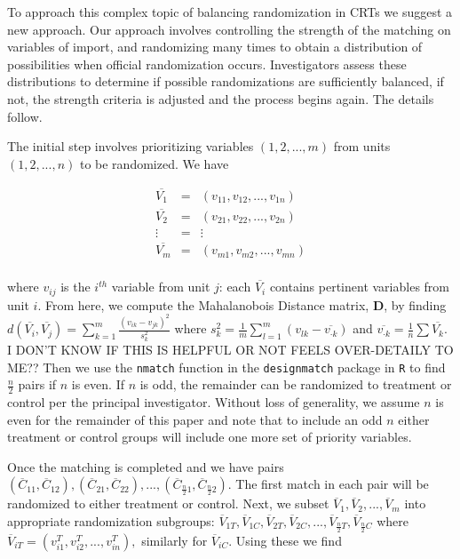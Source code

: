 \documentclass[]{sagej}
\begin{document}
To approach this complex topic of balancing randomization in CRTs we
suggest a new approach. Our approach involves controlling the strength
of the matching on variables of import, and randomizing many times to
obtain a distribution of possibilities when official randomization
occurs. Investigators assess these distributions to determine if
possible randomizations are sufficiently balanced, if not, the strength
criteria is adjusted and the process begins again. The details follow.

The initial step involves prioritizing variables \((1, 2,..., m)\) from
units \((1, 2, ..., n)\) to be randomized. We have

\begin{eqnarray*}
 \overline{V_1} & = & (v_{11}, v_{12},..., v_{1n})\\
 \overline{V_2} & = & (v_{21}, v_{22},..., v_{2n})\\
 \vdots & = & \vdots\\    
 \overline{V_m} & = & (v_{m1}, v_{m2},..., v_{mn})\\
 \end{eqnarray*}

where \(v_{ij}\) is the \(i^{th}\) variable from unit \(j\): each
\(\overline{V_i}\) contains pertinent variables from unit \(i\). From
here, we compute the Mahalanobois Distance matrix, \textbf{D}, by
finding
\(d(\overline{V_i}, \overline{V_j}) = \sum_{k=1}^m \frac{(v_{ik} - v_{jk})^2}{s_k^2}\)
where
\(s_k^2 = \frac{1}{m} \sum_{l=1}^m(v_{lk} - \overline{v_{\cdot k}})\)
and \(\overline{v_{\cdot k}} = \frac{1}{n} \sum \overline{V_k}.\) I
DON'T KNOW IF THIS IS HELPFUL OR NOT FEELS OVER-DETAILY TO ME?? Then we
use the \texttt{nmatch} function in the \texttt{designmatch} \citep{doi}
package in \texttt{R} \citep{nmatch} to find \(\frac{n}{2}\) pairs if
\(n\) is even. If \(n\) is odd, the remainder can be randomized to
treatment or control per the principal investigator. Without loss of
generality, we assume \(n\) is even for the remainder of this paper and
note that to include an odd \(n\) either treatment or control groups
will include one more set of priority variables.

Once the matching is completed and we have pairs
\((\overline{C}_{11}, \overline{C}_{12}), (\overline{C}_{21}, \overline{C}_{22}), ..., (\overline{C}_{\frac{n}{2}1}, \overline{C}_{\frac{n}{2}2}).\)
The first match in each pair will be randomized to either treatment or
control. Next, we subset
\(\overline{V}_1, \overline{V}_2, ..., \overline{V}_m\) into appropriate
randomization subgroups:
\(\overline{V}_{1T}, \overline{V}_{1C}, \overline{V}_{2T}, \overline{V}_{2C},..., \overline{V}_{\frac{n}{2}T}, \overline{V}_{\frac{n}{2}C}\)
where \(\overline{V}_{iT} = (v_{i1}^T, v_{i2}^T,..., v_{in}^T),\)
similarly for \(\overline{V}_{iC}.\) Using these we find
\end{document}
